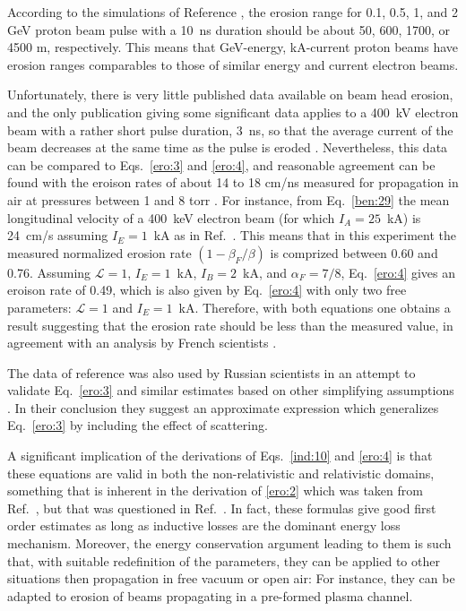 \documentclass [12pt,a4paper,     ]{report} %
\begin{document}
   According to the simulations of Reference \cite{ROSE-2002-}, the erosion range for 0.1, 0.5, 1, and 2 GeV proton beam pulse with a 10~ns duration should be about 50, 600, 1700, or 4500 m, respectively.  This means that GeV-energy, kA-current proton beams have erosion ranges comparables to those of similar energy and current electron beams.

  Unfortunately, there is very little published data available on beam head erosion, and the only publication giving some significant data applies to a 400~kV electron beam with a rather short pulse duration, 3~ns, so that the average current of the beam decreases at the same time as the pulse is eroded \cite[Fig.11]{GREEN1985-}.  Nevertheless, this data can be compared to Eqs.~\eqref{ero:3} and \eqref{ero:4}, and reasonable agreement can be found with the eroison rates of about 14 to 18 cm/ns measured for propagation in air at pressures  between 1 and 8 torr \cite[Table~I\,]{GREEN1985-}.  For instance, from Eq.~\eqref{ben:29} the mean longitudinal velocity of a 400~keV electron beam (for which $I_A = 25$~kA) is 24~cm/s assuming $I_E = 1$~kA as in Ref.~\cite{GREEN1985-}.  This means that in this experiment the measured normalized erosion rate $(1- \beta_F/\beta)$ is comprized between 0.60 and 0.76.  Assuming $\mathcal{L}=1$, $I_E=1$~kA, $I_B=2$~kA, and $\alpha_F=7/8$, Eq.~\eqref{ero:4} gives an eroison rate of 0.49, which is also given by Eq.~\eqref{ero:4} with only two free parameters: $\mathcal{L}=1$ and $I_E = 1$~kA.  Therefore, with both equations one obtains a result suggesting that the erosion rate should be less than the measured value, in agreement with an analysis by French scientists \cite[p.202]{BOUCH1988-}. 

   The data of reference \cite{GREEN1985-} was also used by Russian scientists in an attempt to validate Eq.~\eqref{ero:3} and similar estimates based on other simplifying assumptions \cite{GLAZY1990-}.  In their conclusion they suggest an approximate expression which generalizes Eq.~\eqref{ero:3} by including the effect of scattering.  

   A significant implication of the derivations of Eqs.~\eqref{ind:10} and \eqref{ero:4} is that these equations are valid in both the non-relativistic and relativistic domains, something that is inherent in the derivation of \eqref{ero:2} which was taken from Ref.~\cite{LEE--1980A}, but that was questioned in Ref.~\cite{SHARP1980-}.  In fact, these formulas give good first order estimates as long as inductive losses are the dominant energy loss mechanism.  Moreover, the energy conservation argument leading to them is such that, with suitable redefinition of the parameters, they can be applied to other situations then propagation in free vacuum or open air:  For instance, they can be adapted to erosion of beams propagating in a pre-formed plasma channel.
\end{document}
